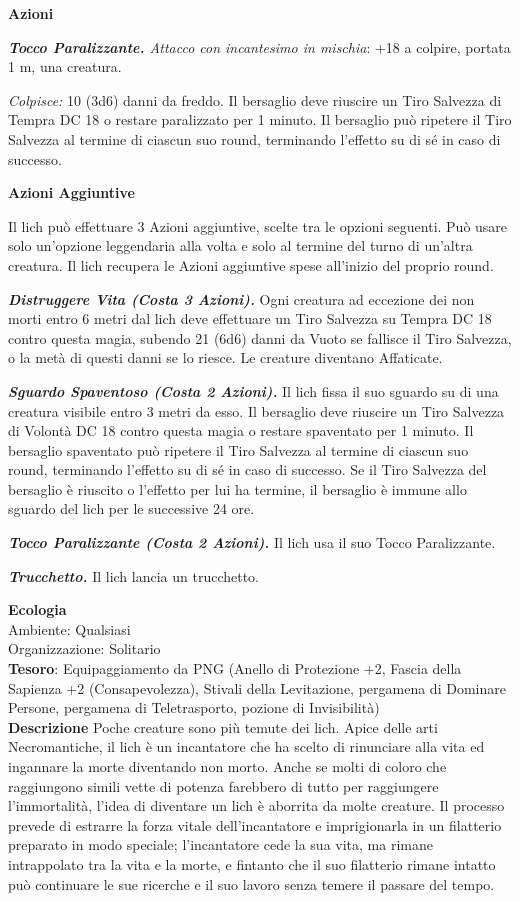 \begin{multicols}{2}
	\textbf{Azioni}

	\textit{\textbf{Tocco Paralizzante.} Attacco con incantesimo in mischia}: +18 a colpire, portata 1 m, una creatura.

	\textit{Colpisce:} 10 (3d6) danni da freddo. Il bersaglio deve riuscire un Tiro Salvezza di Tempra DC 18 o restare paralizzato per 1 minuto. Il bersaglio può ripetere il Tiro Salvezza al termine di ciascun suo round, terminando l'effetto su di sé in caso di successo.

	\textbf{Azioni Aggiuntive}

	Il lich può effettuare 3 Azioni aggiuntive, scelte tra le opzioni seguenti. Può usare solo un'opzione leggendaria alla volta e solo al termine del turno di un'altra creatura. Il lich recupera le Azioni aggiuntive spese all'inizio del proprio round.

	\textit{\textbf{Distruggere Vita (Costa 3 Azioni).}} Ogni creatura ad eccezione dei non morti entro 6 metri dal lich deve effettuare un Tiro Salvezza su Tempra DC 18 contro questa magia, subendo 21 (6d6) danni da Vuoto se fallisce il Tiro Salvezza, o la metà di questi danni se lo riesce. Le creature diventano Affaticate.

	\textit{\textbf{Sguardo Spaventoso (Costa 2 Azioni).}} Il lich fissa il suo sguardo su di una creatura visibile entro 3 metri da esso. Il bersaglio deve riuscire un Tiro Salvezza di Volontà DC 18 contro questa magia o restare spaventato per 1 minuto. Il bersaglio spaventato può ripetere il Tiro Salvezza al termine di ciascun suo round, terminando l'effetto su di sé in caso di successo. Se il Tiro Salvezza del bersaglio è riuscito o l'effetto per lui ha termine, il bersaglio è immune allo sguardo del lich per le successive 24 ore.

	\textit{\textbf{Tocco Paralizzante (Costa 2 Azioni).}} Il lich usa il suo Tocco Paralizzante.

	\textit{\textbf{Trucchetto.}} Il lich lancia un trucchetto.

	\textbf{Ecologia}\\
	Ambiente: Qualsiasi\\
	Organizzazione: Solitario\\
	\textbf{Tesoro}: Equipaggiamento da PNG (Anello di Protezione +2, Fascia della Sapienza +2 (Consapevolezza), Stivali della Levitazione, pergamena di Dominare Persone, pergamena di Teletrasporto, pozione di Invisibilità)\\

	\textbf{Descrizione}
	Poche creature sono più temute dei lich. Apice delle arti Necromantiche, il lich è un incantatore che ha scelto di rinunciare alla vita ed ingannare la morte diventando non morto. Anche se molti di coloro che raggiungono simili vette di potenza farebbero di tutto per raggiungere l'immortalità, l'idea di diventare un lich è aborrita da molte creature. Il processo prevede di estrarre la forza vitale dell'incantatore e imprigionarla in un filatterio preparato in modo speciale; l'incantatore cede la sua vita, ma rimane intrappolato tra la vita e la morte, e fintanto che il suo filatterio rimane intatto può continuare le sue ricerche e il suo lavoro senza temere il passare del tempo.




\end{multicols}
